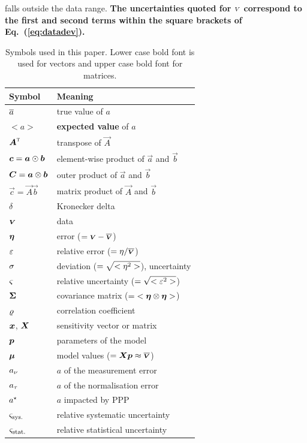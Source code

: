 \documentclass{pasa}
\def\correction#1{{\bfseries #1}}
\begin{document}
falls outside the data range.  \correction{The uncertainties quoted for ${\scriptstyle V}$ correspond to the first and second terms within the square brackets of Eq.~(\ref{eq:datadev}).}

\begin{table}
\caption{Symbols used in this paper. Lower case bold font is used for vectors and upper case bold font for matrices.}
\begin{tabular}{ll}
\hline\hline
Symbol                        & Meaning\\
\hline
$\overline{a}$                     & true value of $a$\\
$<a>$                         & \correction{expected value} of $a$\\
${\boldsymbol{A}}^\text{\textsc{t}}$                 & transpose of $\vec A$\\
$\boldsymbol{c} = \boldsymbol{a}\odot\boldsymbol{b}$ & element-wise product of $\vec a$ and $\vec b$\\
$\boldsymbol{C} = \boldsymbol{a}\otimes\boldsymbol{b}$ & outer product of $\vec a$ and $\vec b$\\
$\vec c = \vec A\vec b$       & matrix product of $\vec A$ and $\vec b$\\
$\delta$                      & Kronecker delta\\
\hline
$\boldsymbol{{\scriptstyle V}}$                      & data\\ 
$\boldsymbol{\eta}$                     & error ($= \boldsymbol{{\scriptstyle V}} - \overline{\boldsymbol{{\scriptstyle V}}}$)\\
$\varepsilon$                     & relative error ($= \eta / \overline{\boldsymbol{{\scriptstyle V}}}$)\\
$\sigma$                        & deviation ($= \sqrt{ {<\eta^2>} }$), uncertainty\\
$\varsigma$                       & relative uncertainty ($= \sqrt{ {<\varepsilon^2>} }$)\\
$\boldsymbol{\Sigma}$                       & covariance matrix ($=  {<\boldsymbol{\eta}\otimes\boldsymbol{\eta}>} $)\\
$\varrho$                       & correlation coefficient\\
$\boldsymbol{x}$, $\boldsymbol{X}$            & sensitivity vector or matrix\\
$\boldsymbol{p}$                     & parameters of the model\\
$\boldsymbol{\mu}$                       & model values ($= \boldsymbol{X}\boldsymbol{p}\approx\overline{\boldsymbol{{\scriptstyle V}}}$)\\
\hline
$a_\nu$                      & $a$ of the measurement error\\
$a_\tau$                      & $a$ of the normalisation error\\
$a^\star$                      & $a$ impacted by PPP\\
$\varsigma_\text{sys.}$                     & relative systematic uncertainty\\
$\varsigma_\text{stat.}$                     & relative statistical uncertainty\\
\hline
\end{tabular}
\end{table}
\end{document}
